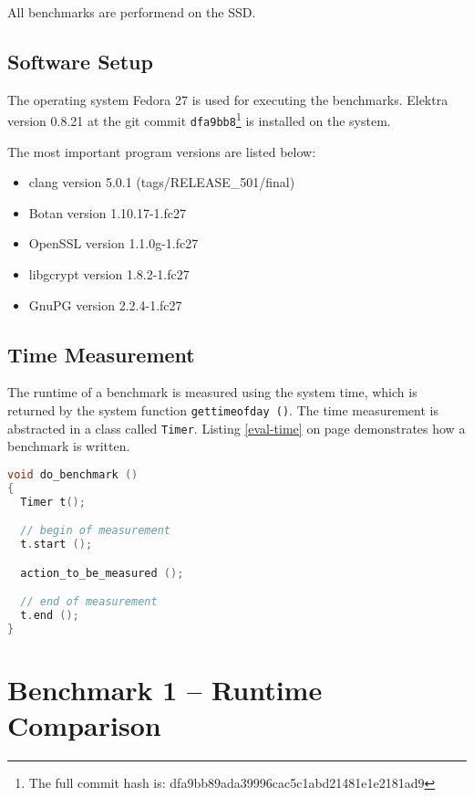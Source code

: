 All benchmarks are performend on the SSD.

  \subsection{Software Setup}

The operating system Fedora 27 is used for executing the benchmarks.
Elektra version 0.8.21 at the git commit \texttt{dfa9bb8}\footnote{The full commit hash is: dfa9bb89ada39996cac5c1abd21481e1e2181ad9} is installed on the system.

The most important program versions are listed below:

\begin{itemize}
  \item clang version 5.0.1 (tags/RELEASE\_501/final)
  \item Botan version 1.10.17-1.fc27
  \item OpenSSL version 1.1.0g-1.fc27
  \item libgcrypt version 1.8.2-1.fc27
  \item GnuPG version 2.2.4-1.fc27
\end{itemize}


  \subsection{Time Measurement}

The runtime of a benchmark is measured using the system time, which is returned by the system function \texttt{gettimeofday ()}.
The time measurement is abstracted in a class called \texttt{Timer}.
Listing \ref{eval-time} on page \pageref{eval-time} demonstrates how a benchmark is written.

\begin{lstlisting}[label=eval-time,language=C,caption={Time measurement for the benchmarks}]
void do_benchmark ()
{
  Timer t();

  // begin of measurement
  t.start ();

  action_to_be_measured ();

  // end of measurement
  t.end ();
}
\end{lstlisting}


\section{Benchmark 1 -- Runtime Comparison}

